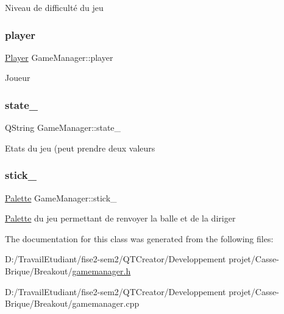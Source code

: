 Niveau de difficulté du jeu \mbox{\label{class_game_manager_af93b2a683a681a346d22577cd75a9dd5}} 
\subsubsection{\texorpdfstring{player}{player}}
{\footnotesize\ttfamily \mbox{\hyperlink{class_player}{Player}} Game\+Manager\+::player}

Joueur \mbox{\label{class_game_manager_ade8777ca190763f4314035f7ee5905c2}} 
\subsubsection{\texorpdfstring{state\+\_\+}{state\_}}
{\footnotesize\ttfamily Q\+String Game\+Manager\+::state\+\_\+}

Etats du jeu (peut prendre deux valeurs \mbox{\label{class_game_manager_a086b81b6572ee3e4505143e284c2d503}} 
\subsubsection{\texorpdfstring{stick\+\_\+}{stick\_}}
{\footnotesize\ttfamily \mbox{\hyperlink{class_palette}{Palette}} Game\+Manager\+::stick\+\_\+}

\mbox{\hyperlink{class_palette}{Palette}} du jeu permettant de renvoyer la balle et de la diriger 

The documentation for this class was generated from the following files\+:\begin{DoxyCompactItemize}
\item 
D\+:/\+Travail\+Etudiant/fise2-\/sem2/\+Q\+T\+Creator/\+Developpement projet/\+Casse-\/\+Brique/\+Breakout/\mbox{\hyperlink{gamemanager_8h}{gamemanager.\+h}}\item 
D\+:/\+Travail\+Etudiant/fise2-\/sem2/\+Q\+T\+Creator/\+Developpement projet/\+Casse-\/\+Brique/\+Breakout/gamemanager.\+cpp\end{DoxyCompactItemize}
